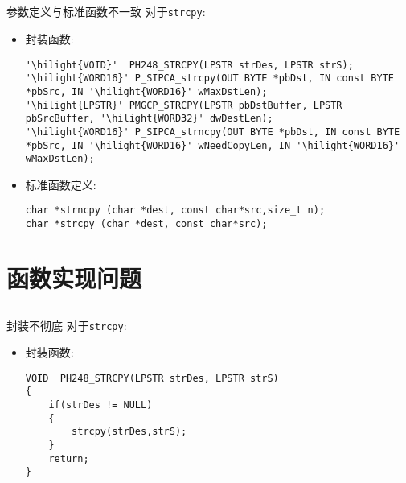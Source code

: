 ﻿\documentclass[hyperref={bookmarks=ture}xcolor=pdflatex,svgnames,table,compress]{beamer}
\begin{document}
\subsection{}
\begin{frame}[containsverbatim]{参数定义与标准函数不一致}
对于\lstinline{strcpy}:

\begin{itemize}
    \item 封装函数:
\begin{lstlisting}[basicstyle=\ttfamily\tiny]
'\hilight{VOID}'  PH248_STRCPY(LPSTR strDes, LPSTR strS);
'\hilight{WORD16}' P_SIPCA_strcpy(OUT BYTE *pbDst, IN const BYTE *pbSrc, IN '\hilight{WORD16}' wMaxDstLen);
'\hilight{LPSTR}' PMGCP_STRCPY(LPSTR pbDstBuffer, LPSTR pbSrcBuffer, '\hilight{WORD32}' dwDestLen);
'\hilight{WORD16}' P_SIPCA_strncpy(OUT BYTE *pbDst, IN const BYTE *pbSrc, IN '\hilight{WORD16}' wNeedCopyLen, IN '\hilight{WORD16}' wMaxDstLen);
\end{lstlisting}
    \item 标准函数定义:
\begin{lstlisting}
char *strncpy (char *dest, const char*src,size_t n);
char *strcpy (char *dest, const char*src);
\end{lstlisting}
\end{itemize}
\end{frame}

\section{函数实现问题}
\subsection{}
\begin{frame}[containsverbatim]{封装不彻底}
对于\lstinline{strcpy}:

\begin{itemize}
    \item 封装函数:
\begin{lstlisting}
VOID  PH248_STRCPY(LPSTR strDes, LPSTR strS)
{
    if(strDes != NULL)
    {
        strcpy(strDes,strS);
    }
    return;
}
\end{lstlisting}
\end{itemize}
\end{frame}
\end{document}
